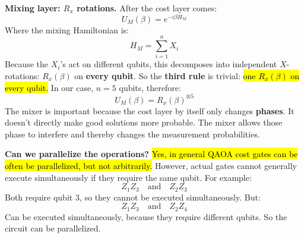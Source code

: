 \begin{deepeningbox}
    \highspace
     \textbf{Mixing layer: $R_x$ rotations.} After the cost layer comes:
    \begin{equation*}
        U_{M}(\beta) = e^{-i \beta H_{M}}
    \end{equation*}
    Where the mixing Hamiltonian is:
    \begin{equation*}
        H_{M} = \sum_{i=1}^{n} X_i
    \end{equation*}
    Because the $X_{i}$'s act on different qubits, this decomposes into independent $X$-rotations: $R_x(\beta)$ on \textbf{every qubit}. So the \textbf{third rule} is trivial: \hl{one $R_x(\beta)$ on every qubit.} In our case, $n=5$ qubits, therefore:
    \begin{equation*}
        U_{M}(\beta) = R_x(\beta)^{\otimes 5}
    \end{equation*}
    The mixer is important because the cost layer by itself only changes \textbf{phases}. It doesn't directly make good solutions more probable. The mixer allows those phase to interfere and thereby changes the measurement probabilities.

    \highspace
    \textcolor{Green3}{ \textbf{Can we parallelize the operations?}} \hl{Yes, in general QAOA cost gates can be often be parallelized, but not arbitrarily.} However, actual gates cannot generally execute simultaneously if they require the same qubit. For example:
    \begin{equation*}
        Z_1 Z_3 \quad \text{and} \quad Z_2 Z_3
    \end{equation*}
    Both require qubit $3$, so they cannot be executed simultaneously. But:
    \begin{equation*}
        Z_1 Z_3 \quad \text{and} \quad Z_2 Z_4
    \end{equation*}
    Can be executed simultaneously, because they require different qubits. So the circuit can be parallelized.
\end{deepeningbox}